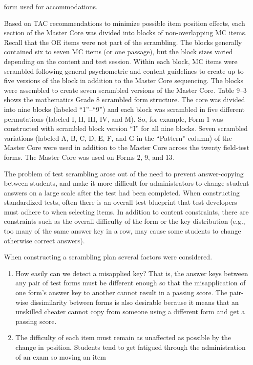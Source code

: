 \documentclass[11pt]{article}
\begin{document}
form used for accommodations.
\par
Based on TAC recommendations to minimize possible item position
effects, each section of the Master Core was divided into blocks of
non-overlapping MC items. Recall that the OE items were not part of
the scrambling. The blocks generally contained six to seven MC items
(or one passage), but the block sizes varied depending on the content
and test session. Within each block, MC items were scrambled following
general psychometric and content guidelines to create up to five
versions of the block in addition to the Master Core sequencing. The
blocks were assembled to create seven scrambled versions of the Master
Core. Table 9–3 shows the mathematics Grade 8 scrambled form
structure. The core was divided into nine blocks (labeled “1”–“9”) and
each block was scrambled in five different permutations (labeled I,
II, III, IV, and M). So, for example, Form 1 was constructed with
scrambled block version “I” for all nine blocks. Seven scrambled
variations (labeled A, B, C, D, E, F, and G in the “Pattern” column)
of the Master Core were used in addition to the Master Core across the
twenty field-test forms. The Master Core was used on Forms 2, 9, and
13.
\par
The problem of test scrambling arose out of the need to prevent
answer-copying between students, and make it more difficult for
administrators to change student answers on a large scale after the
test had been completed. When constructing standardized tests, often
there is an overall test blueprint that test developers must adhere to
when selecting items. In addition to content constraints, there are
constraints such as the overall difficulty of the form or the key
distribution (e.g., too many of the same answer key in a row, may
cause some students to change otherwise correct answers).
\par
When constructing a scrambling plan several factors were considered.
\begin{enumerate}
\item How easily can we detect a misapplied key? That is, the answer
  keys between any pair of test forms must be different enough so that
  the misapplication of one form's answer key to another cannot result
  in a passing score.  The pair-wise dissimilarity between forms is
  also desirable because it means that an unskilled cheater cannot
  copy from someone using a different form and get a passing score.
\item The difficulty of each item must remain as unaffected as
  possible by the change in position.  Students tend to get fatigued
  through the administration of an exam so moving an item
\end{enumerate}
\end{document}
